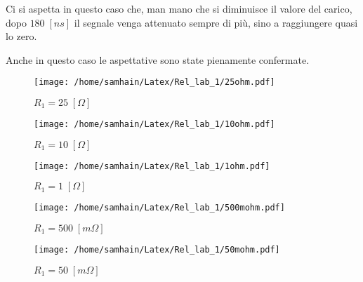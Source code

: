 \documentclass[]{report}
\begin{document}
Ci si aspetta in questo caso che, man mano che si diminuisce il valore del carico, dopo $180 \; [ns]$ il segnale venga attenuato sempre di più, sino a raggiungere quasi lo zero. 

Anche in questo caso le aspettative sono state pienamente confermate.

\begin{figure}[!htb]
	\centering
	\texttt{[image: /home/samhain/Latex/Rel\_lab\_1/25ohm.pdf]}
	\label{ergccwxxg}
	\caption{\label{luegreccvvvgegl} \small $R_1 = 25 \; [\Omega]$ }
\end{figure}


\begin{figure}[!htb]
\centering
\texttt{[image: /home/samhain/Latex/Rel\_lab\_1/10ohm.pdf]}
\label{ergccwxxcvcvxxg}
\caption{\label{luegrecvcvcvczzvvvgegl} \small $R_1 = 10 \; [\Omega]$ }
\end{figure}

\begin{figure}[!htb]
\centering
\texttt{[image: /home/samhain/Latex/Rel\_lab\_1/1ohm.pdf]}
\label{ergccwxxxxg}
\caption{\label{luegrecczzvvvgegl} \small $R_1 = 1 \; [\Omega]$ }
\end{figure}

\begin{figure}[!htb]
	\centering
	\texttt{[image: /home/samhain/Latex/Rel\_lab\_1/500mohm.pdf]}
	\label{ergccwxxccxxg}
	\caption{\label{luegzzrecczzvvvgegl} \small $R_1 = 500 \; [m\Omega]$ }
\end{figure}


\begin{figure}[!htb]
	\centering
	\texttt{[image: /home/samhain/Latex/Rel\_lab\_1/50mohm.pdf]}
	\label{ergccwxxccxxg}
	\caption{\label{luegzzrecczzvvvgegl} \small $R_1 = 50 \; [m\Omega]$ }
\end{figure}
\end{document}
